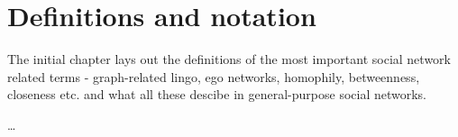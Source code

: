 \chapter{Definitions and notation}

The initial chapter lays out the definitions of the most important social network related terms - graph-related lingo, ego networks, homophily, betweenness, closeness etc. and what all these descibe in general-purpose social networks.

\dots